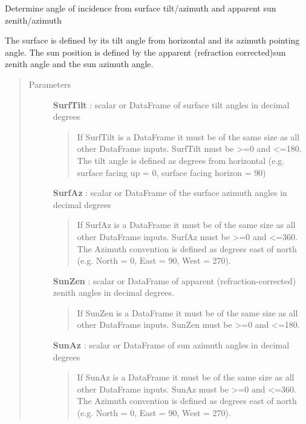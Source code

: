 \documentclass[letterpaper,10pt,english]{sphinxmanual}
\begin{document}
\begin{fulllineitems}
\label{stubs/pvlib.pvl_getaoi:pvlib.pvl_getaoi}
Determine angle of incidence from surface tilt/azimuth and apparent sun zenith/azimuth

The surface is defined by its tilt angle from horizontal and its azimuth pointing angle. 
The sun position is defined by the apparent (refraction corrected)sun zenith angle and the sun 
azimuth angle.
\begin{quote}\begin{description}
\item[{Parameters}] \leavevmode
\textbf{SurfTilt} :  scalar or DataFrame of surface tilt angles in decimal degrees
\begin{quote}

If SurfTilt is a DataFrame it must be of the same size as all other DataFrame
inputs. SurfTilt must be \textgreater{}=0 and \textless{}=180. The tilt angle is defined as
degrees from horizontal (e.g. surface facing up = 0, surface facing
horizon = 90)
\end{quote}

\textbf{SurfAz} :  scalar or DataFrame of the surface azimuth angles in decimal degrees
\begin{quote}

If SurfAz is a DataFrame it must be of the same size as all other DataFrame
inputs. SurfAz must be \textgreater{}=0 and \textless{}=360. The Azimuth convention is defined
as degrees east of north (e.g. North = 0, East = 90, West = 270).
\end{quote}

\textbf{SunZen} : scalar or DataFrame of apparent (refraction-corrected) zenith angles in decimal degrees.
\begin{quote}

If SunZen is a DataFrame it must be of the same size as all other DataFrame 
inputs. SunZen must be \textgreater{}=0 and \textless{}=180.
\end{quote}

\textbf{SunAz} : scalar or DataFrame of sun azimuth angles in decimal degrees
\begin{quote}

If SunAz is a DataFrame it must be of the same size as all other DataFrame
inputs. SunAz must be \textgreater{}=0 and \textless{}=360. The Azimuth convention is defined
as degrees east of north (e.g. North = 0, East = 90, West = 270).
\end{quote}


\end{description}
\end{quote}
\end{fulllineitems}
\end{document}
